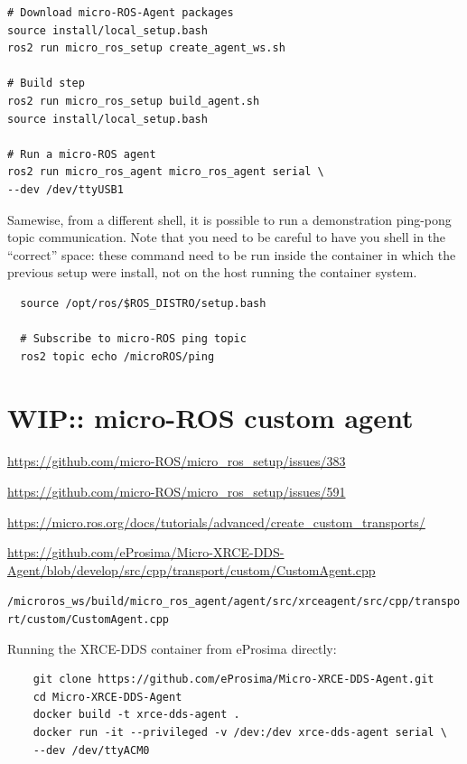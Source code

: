 \documentclass[10pt]{article}
\begin{document}
\begin{tcolorbox}
\begin{verbatim}
# Download micro-ROS-Agent packages
source install/local_setup.bash
ros2 run micro_ros_setup create_agent_ws.sh

# Build step
ros2 run micro_ros_setup build_agent.sh
source install/local_setup.bash

# Run a micro-ROS agent
ros2 run micro_ros_agent micro_ros_agent serial \
--dev /dev/ttyUSB1
\end{verbatim}
\end{tcolorbox}

Samewise, from a different shell, it is possible to run a demonstration ping-pong topic communication.
Note that you need to be careful to have you shell in the ``correct'' space: these command need to be run inside
the container in which the previous setup were install, not on the host running the container system.
\begin{tcolorbox}
\begin{verbatim}
  source /opt/ros/$ROS_DISTRO/setup.bash
  
  # Subscribe to micro-ROS ping topic
  ros2 topic echo /microROS/ping
\end{verbatim}
\end{tcolorbox}

\section{WIP:: micro-ROS custom agent}

\url{https://github.com/micro-ROS/micro_ros_setup/issues/383}

\url{https://github.com/micro-ROS/micro_ros_setup/issues/591}

\url{https://micro.ros.org/docs/tutorials/advanced/create_custom_transports/}

\url{https://github.com/eProsima/Micro-XRCE-DDS-Agent/blob/develop/src/cpp/transport/custom/CustomAgent.cpp}

\verb|/microros_ws/build/micro_ros_agent/agent/src/xrceagent/src/cpp/transport/custom/CustomAgent.cpp|


Running the XRCE-DDS container from eProsima directly:
\begin{tcolorbox}
  \begin{verbatim}
    git clone https://github.com/eProsima/Micro-XRCE-DDS-Agent.git
    cd Micro-XRCE-DDS-Agent
    docker build -t xrce-dds-agent .
    docker run -it --privileged -v /dev:/dev xrce-dds-agent serial \
    --dev /dev/ttyACM0
  \end{verbatim}
\end{tcolorbox}
\end{document}

